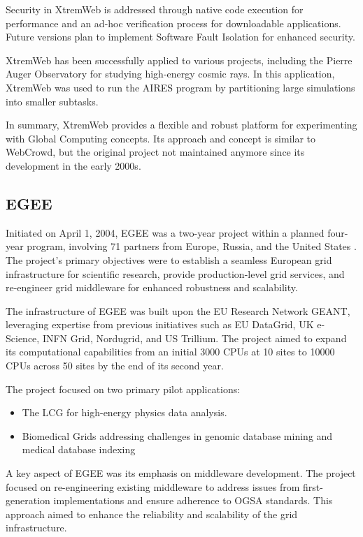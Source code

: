 Security in XtremWeb is addressed through native code execution for performance and an ad-hoc verification process for downloadable applications. Future versions plan to implement Software Fault Isolation for enhanced security.

XtremWeb has been successfully applied to various projects, including the Pierre Auger Observatory for studying high-energy cosmic rays. In this application, XtremWeb was used to run the \ac{AIRES} program by partitioning large simulations into smaller subtasks. \cite{relatedwork:xtremweb}

In summary, XtremWeb provides a flexible and robust platform for experimenting with Global Computing concepts. Its approach and concept is similar to WebCrowd, but the original project not maintained anymore since its development in the early 2000s.

\subsection{EGEE}
\label{subsec:background:related_work:egee}
Initiated on April 1, 2004, \ac{EGEE} was a two-year project within a planned four-year program, involving 71 partners from Europe, Russia, and the United States \cite{relatedwork:egee}. The project's primary objectives were to establish a seamless European grid infrastructure for scientific research, provide production-level grid services, and re-engineer grid middleware for enhanced robustness and scalability. \cite{relatedwork:egee}

The infrastructure of \ac{EGEE} was built upon the EU Research Network GEANT, leveraging expertise from previous initiatives such as EU DataGrid, UK e-Science, INFN Grid, Nordugrid, and US Trillium. The project aimed to expand its computational capabilities from an initial 3000 CPUs at 10 sites to 10000 CPUs across 50 sites by the end of its second year. \cite{relatedwork:egee}

The project focused on two primary pilot applications: 
\begin{itemize}
  \item The \ac{LCG} for high-energy physics data analysis.
  \item Biomedical Grids addressing challenges in genomic database mining and medical database indexing
\end{itemize}

A key aspect of EGEE was its emphasis on middleware development. The project focused on re-engineering existing middleware to address issues from first-generation implementations and ensure adherence to \ac{OGSA} standards. This approach aimed to enhance the reliability and scalability of the grid infrastructure. \cite{relatedwork:egee}

